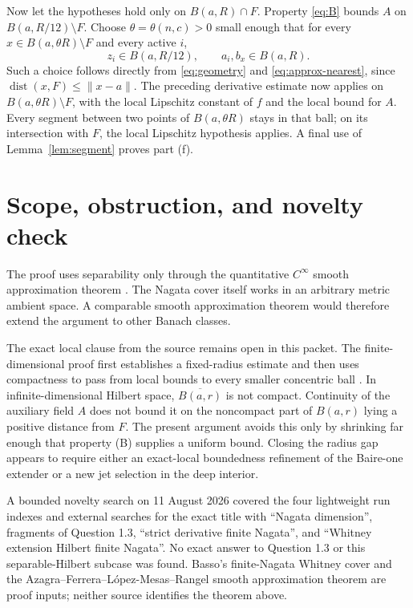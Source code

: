 \documentclass[11pt]{article}
\newcommand{\dist}{\operatorname{dist}}
\begin{document}
Now let the hypotheses hold only on $B(a,R)\cap F$.  Property
\eqref{eq:B} bounds $A$ on $B(a,R/12)\setminus F$.  Choose
$\theta=\theta(n,c)>0$ small enough that for every
$x\in B(a,\theta R)\setminus F$ and every active $i$,
\[
 z_i\in B(a,R/12),
 \qquad a_i,b_x\in B(a,R).
\]
Such a choice follows directly from \eqref{eq:geometry} and
\eqref{eq:approx-nearest}, since
$\dist(x,F)\le\|x-a\|$.  The preceding derivative estimate now applies on
$B(a,\theta R)\setminus F$, with the local Lipschitz constant of $f$ and the
local bound for $A$.  Every segment between two points of
$B(a,\theta R)$ stays in that ball; on its intersection with $F$, the local
Lipschitz hypothesis applies.  A final use of Lemma~\ref{lem:segment} proves
part (f).

\section{Scope, obstruction, and novelty check}

The proof uses separability only through the quantitative $C^\infty$ smooth
approximation theorem \cite{AFLR}.  The Nagata cover itself works in an
arbitrary metric ambient space.  A comparable smooth approximation theorem
would therefore extend the argument to other Banach classes.

The exact local clause from the source remains open in this packet.  The
finite-dimensional proof first establishes a fixed-radius estimate and then
uses compactness to pass from local bounds to every smaller concentric ball
\cite[proof of Theorem 4.1]{KK}.  In infinite-dimensional Hilbert space,
$\overline{B(a,r)}$ is not compact.  Continuity of the auxiliary field $A$
does not bound it on the noncompact part of $B(a,r)$ lying a positive distance
from $F$.  The present argument avoids this only by shrinking far enough that
property (B) supplies a uniform bound.  Closing the radius gap appears to
require either an exact-local boundedness refinement of the Baire-one extender
or a new jet selection in the deep interior.

A bounded novelty search on 11 August 2026 covered the four lightweight run
indexes and external searches for the exact title with ``Nagata dimension'',
fragments of Question 1.3, ``strict derivative finite Nagata'', and ``Whitney
extension Hilbert finite Nagata''.  No exact answer to Question 1.3 or this
separable-Hilbert subcase was found.  Basso's finite-Nagata Whitney cover and
the Azagra--Ferrera--L\'opez-Mesas--Rangel smooth approximation theorem are
proof inputs; neither source identifies the theorem above.
\end{document}
